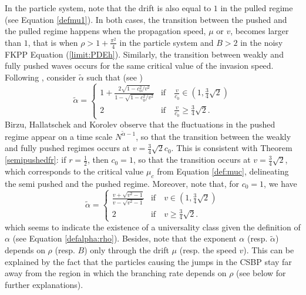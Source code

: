 \documentclass[11pt]{article}
\theoremstyle{plain}
\begin{document}
 
In the particle system, note that the drift is also equal to $1$ in the pulled regime (see Equation \eqref{defmu1}). In both cases, the transition between the pushed and the pulled regime happens when the propagation speed, $\mu$ or $v$, becomes larger than $1$, that is when $\rho>1+\frac{\pi^2}{4}$ in the particle system and $B> 2$ in the noisy FKPP Equation (\ref{limit:PDEh}). Similarly, the transition between weakly and fully pushed waves occurs for the same critical value of the invasion speed. Following \cite{Birzu2018},  consider $\tilde{\alpha}$ such that (see \cite[Equation (8)]{Birzu2018}) 
\begin{equation}\label{defalphat}
\tilde{\alpha}=\begin{cases}
1+\frac{2\sqrt{1-c_0^2/v^2}}{1-\sqrt{1-c_0^2/v^2}} & \text{if} \quad\frac{v}{c_0}\in \left(1,\frac{3}{4}\sqrt{2}\right)\\
2 & \text{if}\quad\frac{v}{c_0} \geqslant \frac{3}{4}\sqrt{2}.
\end{cases}
\end{equation}
Birzu, Hallatschek and Korolev observe that the fluctuations in the pushed regime appear on a time scale $N^{\tilde{\alpha}-1}$, so that the transition between the weakly and fully pushed regimes occurs at $v=\frac{3}{4}\sqrt{2}c_0$. This is consistent with Theorem \ref{semipushedfr}: if $r=\frac{1}{2}$, then $c_0=1$, so that the transition occurs at $v=\frac{3}{4}\sqrt{2}$, which corresponds to the critical value $\mu_c$ from Equation \eqref{def:muc}, delineating the semi pushed and the pushed regime. Moreover, note that, for $c_0=1$, we have 
\begin{equation*}
\tilde{\alpha}=\begin{cases}
\frac{v+\sqrt{v^2-1}}{v-\sqrt{v^2-1}} & \text{if} \quad v\in \left(1,\frac{3}{4}\sqrt{2}\right)\\
2 & \text{if}\quad v \geqslant \frac{3}{4}\sqrt{2}.
\end{cases}
\end{equation*}   
which seems to indicate the existence of a universality class given the definition of $\alpha$ (see Equation \eqref{defalpha:rho}). Besides, note that the exponent $\alpha$ (resp. $\tilde{\alpha}$) depends on $\rho$ (resp. $B$) only through the drift $\mu$ (resp. the speed $v$). This can be explained by the fact that the particles causing the jumps in the CSBP stay far away from the region in which the branching rate depends on $\rho$ (see below for further explanations).
\end{document}
